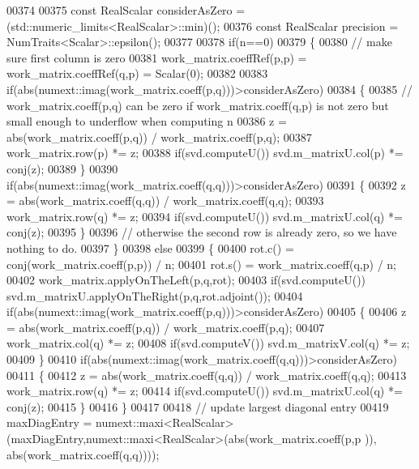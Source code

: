\begin{DoxyCode}
00374 
00375     \textcolor{keyword}{const} RealScalar considerAsZero = (std::numeric\_limits<RealScalar>::min)();
00376     \textcolor{keyword}{const} RealScalar precision = NumTraits<Scalar>::epsilon();
00377 
00378     \textcolor{keywordflow}{if}(n==0)
00379     \{
00380       \textcolor{comment}{// make sure first column is zero}
00381       work\_matrix.coeffRef(p,p) = work\_matrix.coeffRef(q,p) = Scalar(0);
00382 
00383       \textcolor{keywordflow}{if}(abs(numext::imag(work\_matrix.coeff(p,q)))>considerAsZero)
00384       \{
00385         \textcolor{comment}{// work\_matrix.coeff(p,q) can be zero if work\_matrix.coeff(q,p) is not zero but small enough to
       underflow when computing n}
00386         z = abs(work\_matrix.coeff(p,q)) / work\_matrix.coeff(p,q);
00387         work\_matrix.row(p) *= z;
00388         \textcolor{keywordflow}{if}(svd.computeU()) svd.m\_matrixU.col(p) *= conj(z);
00389       \}
00390       \textcolor{keywordflow}{if}(abs(numext::imag(work\_matrix.coeff(q,q)))>considerAsZero)
00391       \{
00392         z = abs(work\_matrix.coeff(q,q)) / work\_matrix.coeff(q,q);
00393         work\_matrix.row(q) *= z;
00394         \textcolor{keywordflow}{if}(svd.computeU()) svd.m\_matrixU.col(q) *= conj(z);
00395       \}
00396       \textcolor{comment}{// otherwise the second row is already zero, so we have nothing to do.}
00397     \}
00398     \textcolor{keywordflow}{else}
00399     \{
00400       rot.c() = conj(work\_matrix.coeff(p,p)) / n;
00401       rot.s() = work\_matrix.coeff(q,p) / n;
00402       work\_matrix.applyOnTheLeft(p,q,rot);
00403       \textcolor{keywordflow}{if}(svd.computeU()) svd.m\_matrixU.applyOnTheRight(p,q,rot.adjoint());
00404       \textcolor{keywordflow}{if}(abs(numext::imag(work\_matrix.coeff(p,q)))>considerAsZero)
00405       \{
00406         z = abs(work\_matrix.coeff(p,q)) / work\_matrix.coeff(p,q);
00407         work\_matrix.col(q) *= z;
00408         \textcolor{keywordflow}{if}(svd.computeV()) svd.m\_matrixV.col(q) *= z;
00409       \}
00410       \textcolor{keywordflow}{if}(abs(numext::imag(work\_matrix.coeff(q,q)))>considerAsZero)
00411       \{
00412         z = abs(work\_matrix.coeff(q,q)) / work\_matrix.coeff(q,q);
00413         work\_matrix.row(q) *= z;
00414         \textcolor{keywordflow}{if}(svd.computeU()) svd.m\_matrixU.col(q) *= conj(z);
00415       \}
00416     \}
00417 
00418     \textcolor{comment}{// update largest diagonal entry}
00419     maxDiagEntry = numext::maxi<RealScalar>(maxDiagEntry,numext::maxi<RealScalar>(abs(work\_matrix.coeff(p,p
      )), abs(work\_matrix.coeff(q,q))));

\end{DoxyCode}

